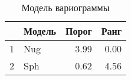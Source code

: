 \begin{table}[H]
\centering
\begin{tabular}{rlrr}
  \hline
 & Модель & Порог & Ранг \\ 
  \hline
1 & Nug & 3.99 & 0.00 \\ 
  2 & Sph & 0.62 & 4.56 \\ 
   \hline
\end{tabular}
\caption{Модель вариограммы} 
\label{table:manual_model}
\end{table}
